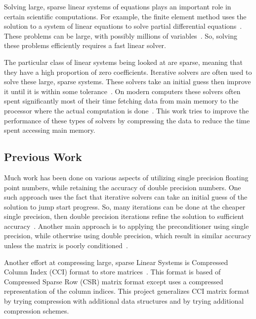 Solving large, sparse linear systems of equations plays an important role in certain scientific computations.
For example, the finite element method uses the solution to a system of linear equations to solve partial differential equations~\cite{Saad:2003:IterativeMethods}.
These problems can be large, with possibly millions of variables~\cite{Davis:2011:FloridaMatrixCollection}.
So, solving these problems efficiently requires a fast linear solver.

The particular class of linear systems being looked at are sparse, meaning that they have a high proportion of zero coefficients.
Iterative solvers are often used to solve these large, sparse systems.
These solvers take an initial guess then improve it until it is within some tolerance~\cite{Saad:2003:IterativeMethods}.
On modern computers these solvers often spent significantly most of their time fetching data from main memory to the processor where the actual computation is done~\cite{Lawlor:2013:compression}.
This work tries to improve the performance of these types of solvers by compressing the data to reduce the time spent accessing main memory.

\subsection{Previous Work}
Much work has been done on various aspects of utilizing single precision floating point numbers, while retaining the accuracy of double precision numbers.
One such approach uses the fact that iterative solvers can take an initial guess of the solution to jump start progress.
So, many iterations can be done at the cheaper single precision, then double precision iterations refine the solution to sufficient accuracy~\cite{Babolin:2008:coursePass, Buttari:2007:coursePass}.
Another main approach is to applying the preconditioner using single precision, while otherwise using double precision, which result in similar accuracy unless the matrix is poorly conditioned~\cite{Buttari:2008:mixedPrec, Hogg:2010:multiplePasses}.

Another effort at compressing large, sparse Linear Systems is Compressed Column Index (CCI) format to store matrices~\cite{Lawlor:2013:compression}.
This format is based of Compressed Sparse Row (CSR) matrix format except uses a compressed representation of the column indices.
This project generalizes CCI matrix format by trying compression with additional data structures and by trying additional compression schemes.